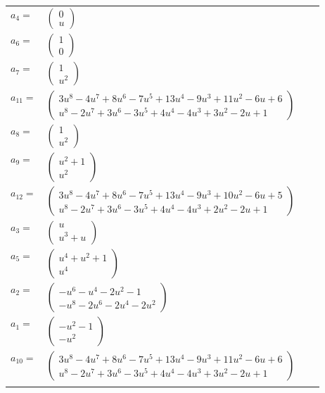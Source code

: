 \documentclass[1p]{elsarticle_modified}
\theoremstyle{definition}
\begin{document}
\begin{tabular}{m{7pt} m{180pt} m{7pt} m{180pt} }
\flushright $a_{4}=$&$\begin{pmatrix}0\\u\end{pmatrix}$ \\
\flushright $a_{6}=$&$\begin{pmatrix}1\\0\end{pmatrix}$ \\
\flushright $a_{7}=$&$\begin{pmatrix}1\\u^2\end{pmatrix}$ \\
\flushright $a_{11}=$&$\begin{pmatrix}3 u^8-4 u^7+8 u^6-7 u^5+13 u^4-9 u^3+11 u^2-6 u+6\\u^8-2 u^7+3 u^6-3 u^5+4 u^4-4 u^3+3 u^2-2 u+1\end{pmatrix}$ \\
\flushright $a_{8}=$&$\begin{pmatrix}1\\u^2\end{pmatrix}$ \\
\flushright $a_{9}=$&$\begin{pmatrix}u^2+1\\u^2\end{pmatrix}$ \\
\flushright $a_{12}=$&$\begin{pmatrix}3 u^8-4 u^7+8 u^6-7 u^5+13 u^4-9 u^3+10 u^2-6 u+5\\u^8-2 u^7+3 u^6-3 u^5+4 u^4-4 u^3+2 u^2-2 u+1\end{pmatrix}$ \\
\flushright $a_{3}=$&$\begin{pmatrix}u\\u^3+u\end{pmatrix}$ \\
\flushright $a_{5}=$&$\begin{pmatrix}u^4+u^2+1\\u^4\end{pmatrix}$ \\
\flushright $a_{2}=$&$\begin{pmatrix}- u^6- u^4-2 u^2-1\\- u^8-2 u^6-2 u^4-2 u^2\end{pmatrix}$ \\
\flushright $a_{1}=$&$\begin{pmatrix}- u^2-1\\- u^2\end{pmatrix}$ \\
\flushright $a_{10}=$&$\begin{pmatrix}3 u^8-4 u^7+8 u^6-7 u^5+13 u^4-9 u^3+11 u^2-6 u+6\\u^8-2 u^7+3 u^6-3 u^5+4 u^4-4 u^3+3 u^2-2 u+1\end{pmatrix}$\\&\end{tabular}
\end{document}
